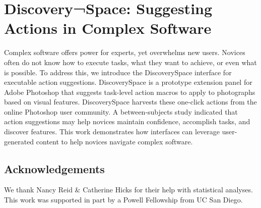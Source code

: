 \chapter{Discovery¬Space: Suggesting Actions in Complex Software}
Complex software offers power for experts, yet overwhelms new users. Novices often do not know how to execute tasks, what they want to achieve, or even what is possible. To address this, we introduce the Discovery\-Space interface for executable action suggestions. Discovery\-Space is a prototype extension panel for Adobe Photoshop that suggests task-level action macros to apply to photographs based on visual features. Discovery\-Space harvests these one-click actions from the online Photoshop user community. A between-subjects study indicated that action suggestions may help novices maintain confidence, accomplish tasks, and discover features. This work demonstrates how interfaces can leverage user-generated content to help novices navigate complex software.











\section{Acknowledgements}
We thank Nancy Reid \& Catherine Hicks for their help with statistical analyses. This work was supported in part by a Powell Fellowship from UC San Diego.